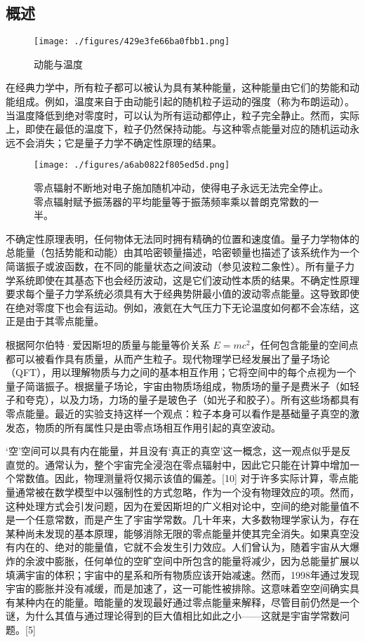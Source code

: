 \subsection{概述}
\begin{figure}[ht]
\centering
\texttt{[image: ./figures/429e3fe66ba0fbb1.png]}
\caption{动能与温度} \label{fig_LD_2}
\end{figure}
在经典力学中，所有粒子都可以被认为具有某种能量，这种能量由它们的势能和动能组成。例如，温度来自于由动能引起的随机粒子运动的强度（称为布朗运动）。当温度降低到绝对零度时，可以认为所有运动都停止，粒子完全静止。然而，实际上，即使在最低的温度下，粒子仍然保持动能。与这种零点能量对应的随机运动永远不会消失；它是量子力学不确定性原理的结果。
\begin{figure}[ht]
\centering
\texttt{[image: ./figures/a6ab0822f805ed5d.png]}
\caption{零点辐射不断地对电子施加随机冲动，使得电子永远无法完全停止。零点辐射赋予振荡器的平均能量等于振荡频率乘以普朗克常数的一半。} \label{fig_LD_3}
\end{figure}
不确定性原理表明，任何物体无法同时拥有精确的位置和速度值。量子力学物体的总能量（包括势能和动能）由其哈密顿量描述，哈密顿量也描述了该系统作为一个简谐振子或波函数，在不同的能量状态之间波动（参见波粒二象性）。所有量子力学系统即使在其基态下也会经历波动，这是它们波动性本质的结果。不确定性原理要求每个量子力学系统必须具有大于经典势阱最小值的波动零点能量。这导致即使在绝对零度下也会有运动。例如，液氦在大气压力下无论温度如何都不会冻结，这正是由于其零点能量。

根据阿尔伯特·爱因斯坦的质量与能量等价关系 \( E = mc^2 \)，任何包含能量的空间点都可以被看作具有质量，从而产生粒子。现代物理学已经发展出了量子场论（QFT），用以理解物质与力之间的基本相互作用；它将空间中的每个点视为一个量子简谐振子。根据量子场论，宇宙由物质场组成，物质场的量子是费米子（如轻子和夸克），以及力场，力场的量子是玻色子（如光子和胶子）。所有这些场都具有零点能量。最近的实验支持这样一个观点：粒子本身可以看作是基础量子真空的激发态，物质的所有属性只是由零点场相互作用引起的真空波动。

‘空’空间可以具有内在能量，并且没有‘真正的真空’这一概念，这一观点似乎是反直觉的。通常认为，整个宇宙完全浸泡在零点辐射中，因此它只能在计算中增加一个常数值。因此，物理测量将仅揭示该值的偏差。[10] 对于许多实际计算，零点能量通常被在数学模型中以强制性的方式忽略，作为一个没有物理效应的项。然而，这种处理方式会引发问题，因为在爱因斯坦的广义相对论中，空间的绝对能量值不是一个任意常数，而是产生了宇宙学常数。几十年来，大多数物理学家认为，存在某种尚未发现的基本原理，能够消除无限的零点能量并使其完全消失。如果真空没有内在的、绝对的能量值，它就不会发生引力效应。人们曾认为，随着宇宙从大爆炸的余波中膨胀，任何单位的空旷空间中所包含的能量将减少，因为总能量扩展以填满宇宙的体积；宇宙中的星系和所有物质应该开始减速。然而，1998年通过发现宇宙的膨胀并没有减缓，而是加速了，这一可能性被排除。这意味着空空间确实具有某种内在的能量。暗能量的发现最好通过零点能量来解释，尽管目前仍然是一个谜，为什么其值与通过理论得到的巨大值相比如此之小——这就是宇宙学常数问题。[5]

